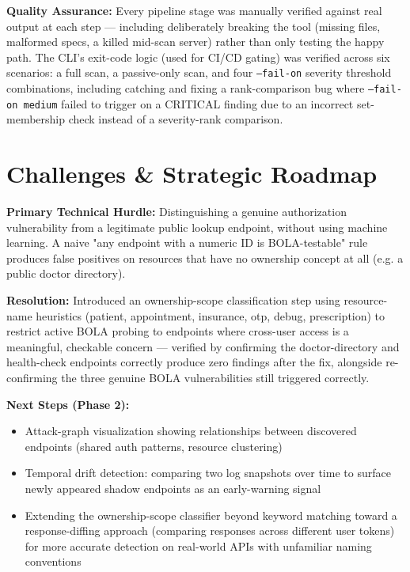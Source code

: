 \documentclass[11pt]{article}
\newcommand{\sublabel}[1]{\textcolor{accent}{\textbf{#1}}}
\begin{document}
\sublabel{Quality Assurance:} Every pipeline stage was manually verified against real output at each step --- including deliberately breaking the tool (missing files, malformed specs, a killed mid-scan server) rather than only testing the happy path. The CLI's exit-code logic (used for CI/CD gating) was verified across six scenarios: a full scan, a passive-only scan, and four \texttt{--fail-on} severity threshold combinations, including catching and fixing a rank-comparison bug where \texttt{--fail-on medium} failed to trigger on a CRITICAL finding due to an incorrect set-membership check instead of a severity-rank comparison.

\section{Challenges \& Strategic Roadmap}

\sublabel{Primary Technical Hurdle:} Distinguishing a genuine authorization vulnerability from a legitimate public lookup endpoint, without using machine learning. A naive "any endpoint with a numeric ID is BOLA-testable" rule produces false positives on resources that have no ownership concept at all (e.g. a public doctor directory).

\sublabel{Resolution:} Introduced an ownership-scope classification step using resource-name heuristics (patient, appointment, insurance, otp, debug, prescription) to restrict active BOLA probing to endpoints where cross-user access is a meaningful, checkable concern --- verified by confirming the doctor-directory and health-check endpoints correctly produce zero findings after the fix, alongside re-confirming the three genuine BOLA vulnerabilities still triggered correctly.

\sublabel{Next Steps (Phase 2):}
\begin{itemize}
    \item Attack-graph visualization showing relationships between discovered endpoints (shared auth patterns, resource clustering)
    \item Temporal drift detection: comparing two log snapshots over time to surface newly appeared shadow endpoints as an early-warning signal
    \item Extending the ownership-scope classifier beyond keyword matching toward a response-diffing approach (comparing responses across different user tokens) for more accurate detection on real-world APIs with unfamiliar naming conventions
\end{itemize}
\end{document}
